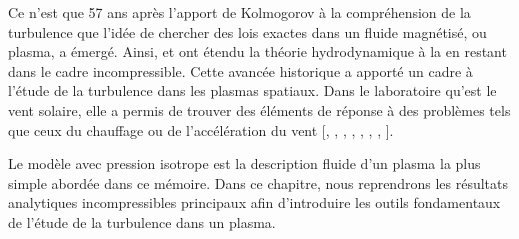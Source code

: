 Ce n'est que 57 ans après l'apport de Kolmogorov à la compréhension de la turbulence que l'idée de chercher des lois exactes dans un fluide magnétisé, ou plasma, a émergé. Ainsi, \cite{politano_von_1998} et \cite{politano_dynamical_1998} ont étendu la théorie hydrodynamique à la  en restant dans le cadre incompressible. Cette avancée historique a apporté un cadre à l'étude de la turbulence dans les plasmas spatiaux. Dans le laboratoire qu'est le vent solaire, elle a permis de trouver des éléments de réponse à des problèmes tels que ceux du chauffage ou de l'accélération du vent [\cite{smith_dependence_2006}, \cite{sorriso-valvo_observation_2007}, \cite{stawarz_turbulent_2009}, \cite{osman_proton_2013}, \cite{bruno_solar_2013}, \cite{alexandrova_solar_2013}, \cite{sahraoui_magnetohydrodynamic_2020}, \cite{marino_scaling_2023}]. 

 Le modèle  avec pression isotrope est la description fluide d'un plasma la plus simple abordée dans ce mémoire. Dans ce chapitre, nous reprendrons les résultats analytiques incompressibles principaux afin d'introduire les outils fondamentaux de l'étude de la turbulence dans un plasma.
 
